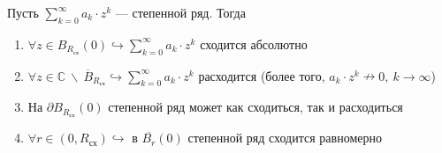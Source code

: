 \documentclass[11pt]{article}
\begin{document}
\begin{theorem}
    Пусть $\displaystyle \sum_{k = 0}^{\infty} a_k \cdot z^k$ --- степенной ряд. Тогда 
    \begin{enumerate}
        \item $\displaystyle \forall z \in B_{R_{\text{сх}}}(0) \hookrightarrow \sum_{k = 0}^{\infty} a_k \cdot z^k$ сходится абсолютно
        \item $\displaystyle \forall z \in \mathbb{C} \ \backslash \ \overline{B}_{R_{\text{сх}}} \hookrightarrow \sum_{k = 0}^{\infty} a_k \cdot z^k$ расходится (более того,
        $a_k \cdot z^k \nrightarrow 0, \ k \to \infty$)
        \item На $\partial B_{R_{\text{сх}}}(0)$ степенной ряд может как сходиться, так и расходиться
        \item $\forall r \in (0, R_{\text{сх}}) \hookrightarrow$ в $\overline{B_r}(0)$ степенной ряд сходится равномерно
    \end{enumerate}
\end{theorem}
    
\end{document}
